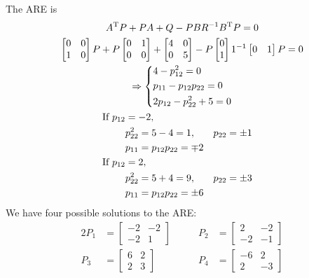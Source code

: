 The ARE is
\begin{gather}
  A^\text{T} P + PA + Q - PBR^{-1}B^\text{T} P = 0 \\
  \begin{bmatrix}
    0 & 0 \\ 1 & 0
  \end{bmatrix} P
  + P \begin{bmatrix}
    0 & 1 \\ 0 & 0
  \end{bmatrix}
  + \begin{bmatrix}
    4 & 0 \\ 0 & 5
  \end{bmatrix}
  - P \begin{bmatrix}
    0 \\ 1
  \end{bmatrix} 1^{-1} \begin{bmatrix}
    0 & 1
  \end{bmatrix} P = 0 \\
  \Rightarrow \begin{dcases}
    4 - p_{12}^2 = 0 \\
    p_{11} - p_{12} p_{22} = 0 \\
    2p_{12} - p_{22}^2 + 5 = 0
  \end{dcases} \\
  \begin{aligned}
    \text{If } p_{12}&=-2, \\
    & p_{22}^2 = 5-4=1, && p_{22} = \pm 1 \\
    & p_{11}=p_{12}p_{22} = \mp 2 \\
    \text{If } p_{12}&=2, \\
    & p_{22}^2 = 5+4=9, && p_{22} = \pm 3 \\
    & p_{11}=p_{12}p_{22} = \pm 6
  \end{aligned}
\end{gather}
We have four possible solutions to the ARE:
\begin{alignat}{2}
  P_1 &= \begin{bmatrix}
    -2 & -2 \\ -2 & 1
  \end{bmatrix} \qquad & P_2 &= \begin{bmatrix}
    2 & -2 \\ -2 & -1
  \end{bmatrix} \\
  P_3 &= \begin{bmatrix}
    6 & 2 \\ 2 & 3
  \end{bmatrix} & P_4 &= \begin{bmatrix}
    -6 & 2 \\ 2 & -3
  \end{bmatrix}
\end{alignat}
